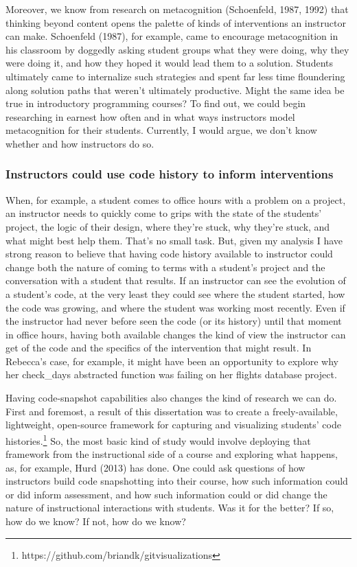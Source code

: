 Moreover, we know from research on metacognition (Schoenfeld, 1987,
1992) that thinking beyond content opens the palette of kinds of
interventions an instructor can make. Schoenfeld (1987), for example,
came to encourage metacognition in his classroom by doggedly asking
student groups what they were doing, why they were doing it, and how
they hoped it would lead them to a solution. Students ultimately came to
internalize such strategies and spent far less time floundering along
solution paths that weren't ultimately productive. Might the same idea
be true in introductory programming courses? To find out, we could begin
researching in earnest how often and in what ways instructors model
metacognition for their students. Currently, I would argue, we don't
know whether and how instructors do so.

\subsubsection{Instructors could use code history to inform
interventions}\label{instructors-could-use-code-history-to-inform-interventions}

When, for example, a student comes to office hours with a problem on a
project, an instructor needs to quickly come to grips with the state of
the students' project, the logic of their design, where they're stuck,
why they're stuck, and what might best help them. That's no small task.
But, given my analysis I have strong reason to believe that having code
history available to instructor could change both the nature of coming
to terms with a student's project and the conversation with a student
that results. If an instructor can see the evolution of a student's
code, at the very least they could see where the student started, how
the code was growing, and where the student was working most recently.
Even if the instructor had never before seen the code (or its history)
until that moment in office hours, having both available changes the
kind of view the instructor can get of the code and the specifics of the
intervention that might result. In Rebecca's case, for example, it might
have been an opportunity to explore why her check\_days abstracted
function was failing on her flights database project.

Having code-snapshot capabilities also changes the kind of research we
can do. First and foremost, a result of this dissertation was to create
a freely-available, lightweight, open-source framework for capturing and
visualizing students' code histories.\footnote{https://github.com/briandk/gitvisualizations}
So, the most basic kind of study would involve deploying that framework
from the instructional side of a course and exploring what happens, as,
for example, Hurd (2013) has done. One could ask questions of how
instructors build code snapshotting into their course, how such
information could or did inform assessment, and how such information
could or did change the nature of instructional interactions with
students. Was it for the better? If so, how do we know? If not, how do
we know?

